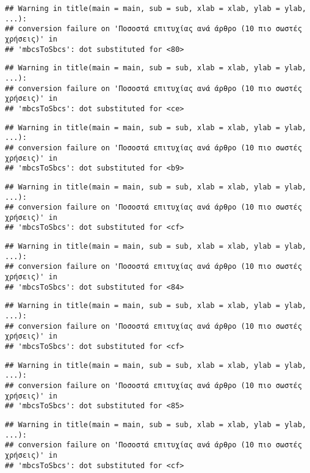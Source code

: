 \documentclass[
]{article}
\begin{document}
\begin{verbatim}
## Warning in title(main = main, sub = sub, xlab = xlab, ylab = ylab, ...):
## conversion failure on 'Ποσοστά επιτυχίας ανά άρθρο (10 πιο σωστές χρήσεις)' in
## 'mbcsToSbcs': dot substituted for <80>
\end{verbatim}

\begin{verbatim}
## Warning in title(main = main, sub = sub, xlab = xlab, ylab = ylab, ...):
## conversion failure on 'Ποσοστά επιτυχίας ανά άρθρο (10 πιο σωστές χρήσεις)' in
## 'mbcsToSbcs': dot substituted for <ce>
\end{verbatim}

\begin{verbatim}
## Warning in title(main = main, sub = sub, xlab = xlab, ylab = ylab, ...):
## conversion failure on 'Ποσοστά επιτυχίας ανά άρθρο (10 πιο σωστές χρήσεις)' in
## 'mbcsToSbcs': dot substituted for <b9>
\end{verbatim}

\begin{verbatim}
## Warning in title(main = main, sub = sub, xlab = xlab, ylab = ylab, ...):
## conversion failure on 'Ποσοστά επιτυχίας ανά άρθρο (10 πιο σωστές χρήσεις)' in
## 'mbcsToSbcs': dot substituted for <cf>
\end{verbatim}

\begin{verbatim}
## Warning in title(main = main, sub = sub, xlab = xlab, ylab = ylab, ...):
## conversion failure on 'Ποσοστά επιτυχίας ανά άρθρο (10 πιο σωστές χρήσεις)' in
## 'mbcsToSbcs': dot substituted for <84>
\end{verbatim}

\begin{verbatim}
## Warning in title(main = main, sub = sub, xlab = xlab, ylab = ylab, ...):
## conversion failure on 'Ποσοστά επιτυχίας ανά άρθρο (10 πιο σωστές χρήσεις)' in
## 'mbcsToSbcs': dot substituted for <cf>
\end{verbatim}

\begin{verbatim}
## Warning in title(main = main, sub = sub, xlab = xlab, ylab = ylab, ...):
## conversion failure on 'Ποσοστά επιτυχίας ανά άρθρο (10 πιο σωστές χρήσεις)' in
## 'mbcsToSbcs': dot substituted for <85>
\end{verbatim}

\begin{verbatim}
## Warning in title(main = main, sub = sub, xlab = xlab, ylab = ylab, ...):
## conversion failure on 'Ποσοστά επιτυχίας ανά άρθρο (10 πιο σωστές χρήσεις)' in
## 'mbcsToSbcs': dot substituted for <cf>
\end{verbatim}
\end{document}
